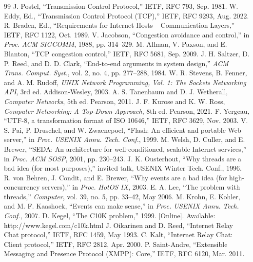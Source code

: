 \documentclass[conference]{IEEEtran}
\begin{document}
\balance
\begin{thebibliography}{99}
 J. Postel, ``Transmission Control Protocol,'' IETF, RFC 793, Sep. 1981.
 W. Eddy, Ed., ``Transmission Control Protocol (TCP),'' IETF, RFC 9293, Aug. 2022.
 R. Braden, Ed., ``Requirements for Internet Hosts -- Communication Layers,'' IETF, RFC 1122, Oct. 1989.
 V. Jacobson, ``Congestion avoidance and control,'' in \emph{Proc. ACM SIGCOMM}, 1988, pp. 314--329.
 M. Allman, V. Paxson, and E. Blanton, ``TCP congestion control,'' IETF, RFC 5681, Sep. 2009.
 J. H. Saltzer, D. P. Reed, and D. D. Clark, ``End-to-end arguments in system design,'' \emph{ACM Trans. Comput. Syst.}, vol. 2, no. 4, pp. 277--288, 1984.
 W. R. Stevens, B. Fenner, and A. M. Rudoff, \emph{UNIX Network Programming, Vol. 1: The Sockets Networking API}, 3rd ed. Addison-Wesley, 2003.
 A. S. Tanenbaum and D. J. Wetherall, \emph{Computer Networks}, 5th ed. Pearson, 2011.
 J. F. Kurose and K. W. Ross, \emph{Computer Networking: A Top-Down Approach}, 8th ed. Pearson, 2021.
 F. Yergeau, ``UTF-8, a transformation format of ISO 10646,'' IETF, RFC 3629, Nov. 2003.
 V. S. Pai, P. Druschel, and W. Zwaenepoel, ``Flash: An efficient and portable Web server,'' in \emph{Proc. USENIX Annu. Tech. Conf.}, 1999.
 M. Welsh, D. Culler, and E. Brewer, ``SEDA: An architecture for well-conditioned, scalable Internet services,'' in \emph{Proc. ACM SOSP}, 2001, pp. 230--243.
 J. K. Ousterhout, ``Why threads are a bad idea (for most purposes),'' invited talk, USENIX Winter Tech. Conf., 1996.
 R. von Behren, J. Condit, and E. Brewer, ``Why events are a bad idea (for high-concurrency servers),'' in \emph{Proc. HotOS IX}, 2003.
 E. A. Lee, ``The problem with threads,'' \emph{Computer}, vol. 39, no. 5, pp. 33--42, May 2006.
 M. Krohn, E. Kohler, and M. F. Kaashoek, ``Events can make sense,'' in \emph{Proc. USENIX Annu. Tech. Conf.}, 2007.
 D. Kegel, ``The C10K problem,'' 1999. [Online]. Available: http://www.kegel.com/c10k.html
 J. Oikarinen and D. Reed, ``Internet Relay Chat protocol,'' IETF, RFC 1459, May 1993.
 C. Kalt, ``Internet Relay Chat: Client protocol,'' IETF, RFC 2812, Apr. 2000.
 P. Saint-Andre, ``Extensible Messaging and Presence Protocol (XMPP): Core,'' IETF, RFC 6120, Mar. 2011.

\end{thebibliography}
\end{document}
